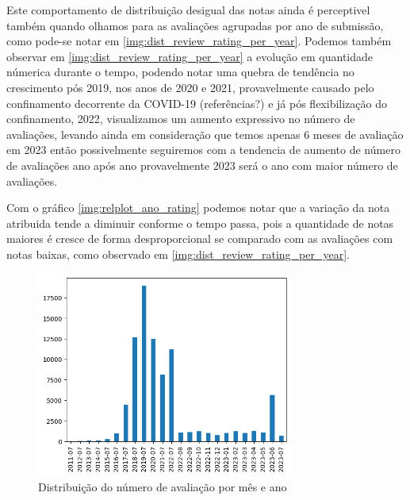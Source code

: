 Este comportamento de distribuição desigual das notas ainda é perceptivel também quando olhamos para as avaliações agrupadas por ano de submissão, como pode-se notar em \ref{img:dist_review_rating_per_year}. Podemos também observar em \ref{img:dist_review_rating_per_year} a evolução em quantidade númerica durante o tempo, podendo notar uma quebra de tendência no crescimento pós 2019, nos anos de 2020 e 2021, provavelmente causado pelo confinamento decorrente da COVID-19 (referências?) e já pós flexibilização do confinamento, 2022, visualizamos um aumento expressivo no número de avaliações, levando ainda em consideração que temos apenas 6 meses de avaliação em 2023 então possivelmente seguiremos com a tendencia de aumento de número de avaliações ano após ano provavelmente 2023 será o ano com maior número de avaliações.

Com o gráfico \ref{img:relplot_ano_rating} podemos notar que a variação da nota atribuida tende a diminuir conforme o tempo passa, pois a quantidade de notas maiores é cresce de forma desproporcional se comparado com as avaliações com notas baixas, como observado em \ref{img:dist_review_rating_per_year}.

\begin{figure}
	\centering
	\includegraphics[width=0.75\textwidth]{figs/exploratoria/distribuicao_ano_mes_avaliacao.png}
	\caption{Distribuição do número de avaliação por mês e ano}
	\label{img:dist_ano_mes_avaliacao}
\end{figure}

